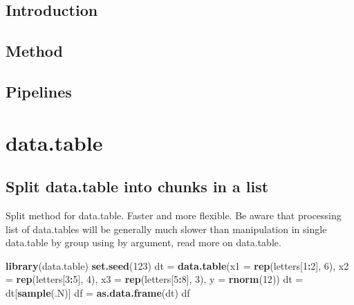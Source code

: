 \documentclass[]{book}
\makeatletter
\newenvironment{Shaded}{\begin{snugshade}}{\end{snugshade}}
\newcommand{\DataTypeTok}[1]{\textcolor[rgb]{0.13,0.29,0.53}{#1}}
\newcommand{\DecValTok}[1]{\textcolor[rgb]{0.00,0.00,0.81}{#1}}
\newcommand{\KeywordTok}[1]{\textcolor[rgb]{0.13,0.29,0.53}{\textbf{#1}}}
\newcommand{\NormalTok}[1]{#1}
\newcommand{\OperatorTok}[1]{\textcolor[rgb]{0.81,0.36,0.00}{\textbf{#1}}}
\newcommand{\StringTok}[1]{\textcolor[rgb]{0.31,0.60,0.02}{#1}}
\newenvironment{kframe}{%
\medskip{}
\setlength{\fboxsep}{.8em}
 \def\at@end@of@kframe{}%
 \ifinner\ifhmode%
  \def\at@end@of@kframe{\end{minipage}}%
  \begin{minipage}{\columnwidth}%
 \fi\fi%
 \def\FrameCommand##1{\hskip\@totalleftmargin \hskip-\fboxsep
 \colorbox{shadecolor}{##1}\hskip-\fboxsep
     \hskip-\linewidth \hskip-\@totalleftmargin \hskip\columnwidth}%
 \MakeFramed {\advance\hsize-\width
   \@totalleftmargin\z@ \linewidth\hsize
   \@setminipage}}%
 {\par\unskip\endMakeFramed%
 \at@end@of@kframe}
\renewenvironment{Shaded}{\begin{kframe}}{\end{kframe}}
\makeatother
\begin{document}
\hypertarget{introduction}{%
\section{Introduction}\label{introduction}}

\hypertarget{method}{%
\section{Method}\label{method}}

\hypertarget{pipelines}{%
\section{Pipelines}\label{pipelines}}

\hypertarget{section-6}{%
\section{}\label{section-6}}

\hypertarget{data.table}{%
\chapter{data.table}\label{data.table}}

\hypertarget{split-data.table-into-chunks-in-a-list}{%
\section{Split data.table into chunks in a list}\label{split-data.table-into-chunks-in-a-list}}

Split method for data.table. Faster and more flexible. Be aware that processing list of data.tables will be generally much slower than manipulation in single data.table by group using by argument, read more on data.table.

\begin{Shaded}
\begin{Highlighting}[]
\KeywordTok{library}\NormalTok{(data.table)}
\KeywordTok{set.seed}\NormalTok{(}\DecValTok{123}\NormalTok{)}
\NormalTok{dt =}\StringTok{ }\KeywordTok{data.table}\NormalTok{(}\DataTypeTok{x1 =} \KeywordTok{rep}\NormalTok{(letters[}\DecValTok{1}\OperatorTok{:}\DecValTok{2}\NormalTok{], }\DecValTok{6}\NormalTok{), }
                \DataTypeTok{x2 =} \KeywordTok{rep}\NormalTok{(letters[}\DecValTok{3}\OperatorTok{:}\DecValTok{5}\NormalTok{], }\DecValTok{4}\NormalTok{), }
                \DataTypeTok{x3 =} \KeywordTok{rep}\NormalTok{(letters[}\DecValTok{5}\OperatorTok{:}\DecValTok{8}\NormalTok{], }\DecValTok{3}\NormalTok{), }
                \DataTypeTok{y =} \KeywordTok{rnorm}\NormalTok{(}\DecValTok{12}\NormalTok{))}
\NormalTok{dt =}\StringTok{ }\NormalTok{dt[}\KeywordTok{sample}\NormalTok{(.N)]}
\NormalTok{df =}\StringTok{ }\KeywordTok{as.data.frame}\NormalTok{(dt)}
\NormalTok{df}
\end{Highlighting}
\end{Shaded}
\end{document}

